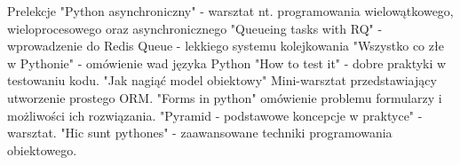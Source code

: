 \begin{rubric}{Prelekcje}
\entry*[PyConPL 2015]"Python asynchroniczny" - warsztat nt. programowania
    wielowątkowego, wieloprocesowego oraz asynchronicznego
"Queueing tasks with RQ" - wprowadzenie do
    Redis Queue - lekkiego systemu kolejkowania
\entry*[PyConPL 2014]"Wszystko co złe w Pythonie" - omówienie wad języka Python
\entry*[PyConPL 2013]"How to test it" - dobre praktyki w testowaniu kodu.
\entry*[4developers 2013]"Jak nagiąć model obiektowy" Mini-warsztat
    przedstawiający utworzenie prostego ORM.
\entry*[PyConPL 2012]"Forms in python" omówienie problemu formularzy
    i możliwości ich rozwiązania.
\entry*[PyconPL 2012]"Pyramid - podstawowe koncepcje w praktyce" - warsztat.
\entry*[PyConPL 2011]"Hic sunt pythones" - zaawansowane techniki programowania
    obiektowego.
\end{rubric}
